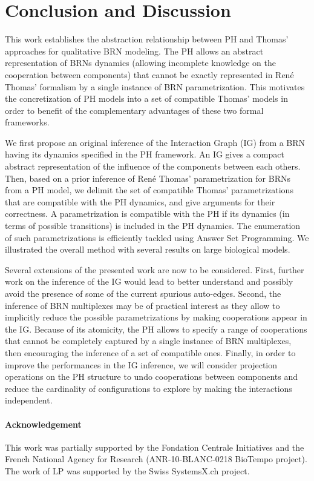 \section{Conclusion and Discussion}

This work establishes the abstraction relationship between PH and Thomas' approaches for
qualitative BRN modeling.
The PH allows an abstract representation of BRNs dynamics (allowing incomplete knowledge on the
cooperation between components) that cannot be exactly represented in Ren\'e Thomas' formalism by a
single instance of BRN parametrization.
This motivates the concretization of PH models into a set of compatible Thomas' models in order to benefit
of the complementary advantages of these two formal frameworks.

We first propose an original inference of the Interaction Graph (IG) from a BRN
having its dynamics specified in the PH framework.
An IG gives a compact abstract representation of the influence of the components between each
others.
Then, based on a prior inference of Ren\'e Thomas' parametrization for BRNs from a PH model, we
delimit the set of compatible Thomas' parametrizations that are compatible with the PH dynamics,
and give arguments for their correctness.
A parametrization is compatible with the PH if its dynamics (in terms of possible transitions) is included in the PH dynamics.
The enumeration of such parametrizations is efficiently tackled using Answer Set Programming.
We illustrated the overall method with several results on large biological models.

Several extensions of the presented work are now to be considered.
First, further work on the inference of the IG would lead to better understand and possibly avoid
the presence of some of the current spurious auto-edges.
Second, the inference of BRN multiplexes \cite{BernotMultiplexes} may be of practical interest 
as they allow to implicitly reduce the possible parametrizations by making cooperations appear
in the IG.
Because of its atomicity, the PH allows to specify a range of cooperations that cannot be
completely captured by a single instance of BRN multiplexes, then encouraging the inference of a set
of compatible ones.
Finally, in order to improve the performances in the IG inference, we will consider projection operations on
the PH structure to undo cooperations between components and reduce the cardinality of
configurations to explore by making the interactions independent.

\paragraph{Acknowledgement}
This work was partially supported by the Fondation Centrale Initiatives and
the French National Agency for Research (ANR-10-BLANC-0218 BioTempo project).
The work of LP was supported by the Swiss SystemsX.ch project.
